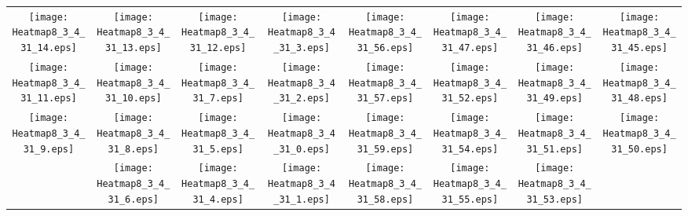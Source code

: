 \documentclass{standalone}
\begin{document}
\begin{tabular}{ *8{c} }
\texttt{[image: Heatmap8\_3\_4\_31\_14.eps]} & \texttt{[image: Heatmap8\_3\_4\_31\_13.eps]} & \texttt{[image: Heatmap8\_3\_4\_31\_12.eps]} & \texttt{[image: Heatmap8\_3\_4\_31\_3.eps]} & \texttt{[image: Heatmap8\_3\_4\_31\_56.eps]} & \texttt{[image: Heatmap8\_3\_4\_31\_47.eps]} & \texttt{[image: Heatmap8\_3\_4\_31\_46.eps]} & \texttt{[image: Heatmap8\_3\_4\_31\_45.eps]} \\
\texttt{[image: Heatmap8\_3\_4\_31\_11.eps]} & \texttt{[image: Heatmap8\_3\_4\_31\_10.eps]} & \texttt{[image: Heatmap8\_3\_4\_31\_7.eps]} & \texttt{[image: Heatmap8\_3\_4\_31\_2.eps]} & \texttt{[image: Heatmap8\_3\_4\_31\_57.eps]} & \texttt{[image: Heatmap8\_3\_4\_31\_52.eps]} & \texttt{[image: Heatmap8\_3\_4\_31\_49.eps]} & \texttt{[image: Heatmap8\_3\_4\_31\_48.eps]} \\
\texttt{[image: Heatmap8\_3\_4\_31\_9.eps]} & \texttt{[image: Heatmap8\_3\_4\_31\_8.eps]} & \texttt{[image: Heatmap8\_3\_4\_31\_5.eps]} & \texttt{[image: Heatmap8\_3\_4\_31\_0.eps]} & \texttt{[image: Heatmap8\_3\_4\_31\_59.eps]} & \texttt{[image: Heatmap8\_3\_4\_31\_54.eps]} & \texttt{[image: Heatmap8\_3\_4\_31\_51.eps]} & \texttt{[image: Heatmap8\_3\_4\_31\_50.eps]} \\
 & \texttt{[image: Heatmap8\_3\_4\_31\_6.eps]} & \texttt{[image: Heatmap8\_3\_4\_31\_4.eps]} & \texttt{[image: Heatmap8\_3\_4\_31\_1.eps]} & \texttt{[image: Heatmap8\_3\_4\_31\_58.eps]} & \texttt{[image: Heatmap8\_3\_4\_31\_55.eps]} & \texttt{[image: Heatmap8\_3\_4\_31\_53.eps]} &  
\end{tabular}
\end{document}
